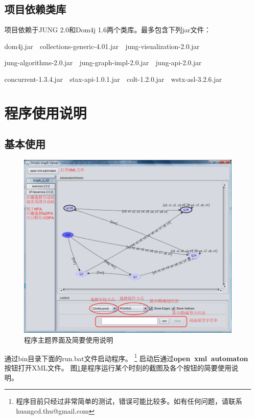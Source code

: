 \documentclass[12pt,a4paper]{article}
\begin{document}
\begin{CJK}{UTF8}{song}
    \subsection{项目依赖类库}
    项目依赖于JUNG 2.0和Dom4j 1.6两个类库。最多包含下列jar文件：

    dom4j.jar~~collections-generic-4.01.jar~~jung-visualization-2.0.jar

    jung-algorithms-2.0.jar~~jung-graph-impl-2.0.jar~~jung-api-2.0.jar

    concurrent-1.3.4.jar~~stax-api-1.0.1.jar~~colt-1.2.0.jar~~wstx-asl-3.2.6.jar

    \section{程序使用说明}

    \subsection{基本使用}
    \begin{figure}
    \centering
    \includegraphics[scale=.4]{full}
    \caption{程序主题界面及简要使用说明}
    \label{fig:full}
    \end{figure}

    通过bin目录下面的run.bat文件启动程序。
    \footnote{程序目前只经过非常简单的测试，错误可能比较多。如有任何问题，请联系 huangcd.thu@gmail.com}
    启动后通过\textbf{open~xml~automaton}按钮打开XML文件。
    图\ref{fig:full}是程序运行某个时刻的截图及各个按钮的简要使用说明。


\end{CJK}
\end{document}
